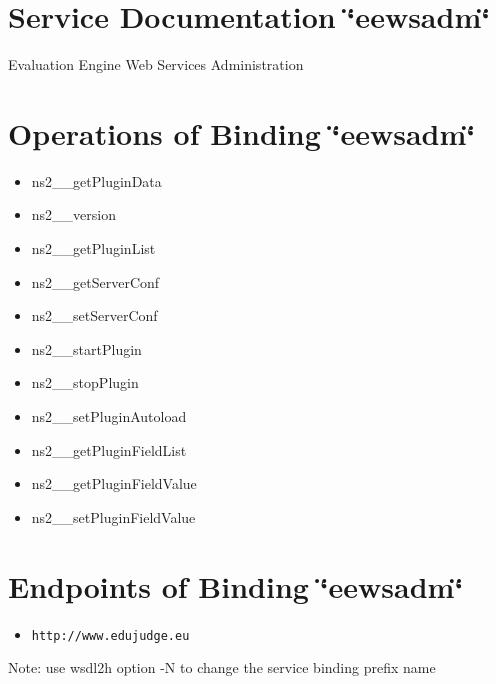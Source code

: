 \section{Service Documentation \char`\"{}eewsadm\char`\"{}}\label{eewsadm_eewsadm_service}
Evaluation Engine Web Services Administration\section{Operations of Binding  \char`\"{}eewsadm\char`\"{}}\label{eewsadm_eewsadm_operations}
\begin{itemize}
\item ns2\_\-\_\-getPluginData\item ns2\_\-\_\-version\item ns2\_\-\_\-getPluginList\item ns2\_\-\_\-getServerConf\item ns2\_\-\_\-setServerConf\item ns2\_\-\_\-startPlugin\item ns2\_\-\_\-stopPlugin\item ns2\_\-\_\-setPluginAutoload\item ns2\_\-\_\-getPluginFieldList\item ns2\_\-\_\-getPluginFieldValue\item ns2\_\-\_\-setPluginFieldValue\end{itemize}
\section{Endpoints of Binding  \char`\"{}eewsadm\char`\"{}}\label{eewsadm_eewsadm_ports}
\begin{itemize}
\item {\tt http://www.edujudge.eu}\end{itemize}


Note: use wsdl2h option -N to change the service binding prefix name 